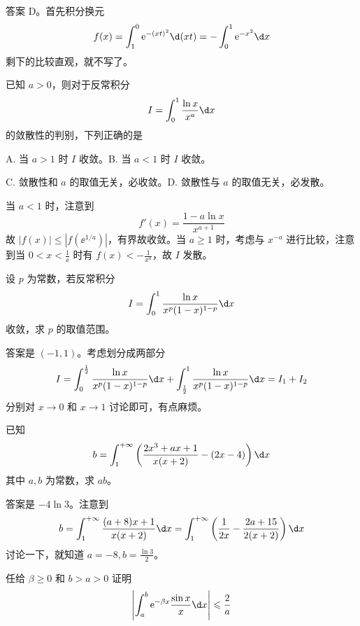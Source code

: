 \begin{solution}
	答案 D。首先积分换元
	\[ f(x) = \int_{1}^{0} \ee^{-(xt)^2} \d (xt) = -\int_{0}^{1} \ee^{-x^2} \d x  \]
	剩下的比较直观，就不写了。
\end{solution}


\begin{problem}[000027]
已知 $a > 0$，则对于反常积分
\[ I = \int_{0}^{1} \frac{\ln x}{x^a} \d x \]
的敛散性的判别，下列正确的是

A. 当 $a > 1$ 时 $I$ 收敛。B. 当 $a < 1$ 时 $I$ 收敛。

C. 敛散性和 $a$ 的取值无关，必收敛。D. 敛散性与 $a$ 的取值无关，必发散。
\end{problem}
\begin{solution}
	当 $a < 1$ 时，注意到
	\[ f'(x) = \frac{1 - a \ln x}{x^{a+1}} \]
	故 $|f(x)| \leqslant |f(\ee^{1/a})|$，有界故收敛。当 $a \geqslant 1$ 时，考虑与 $x^{-a}$ 进行比较，注意到当 $0 < x < \frac{1}{\ee}$ 时有 $f(x) < -\frac{1}{x^a}$，故 $I$ 发散。
\end{solution}

\begin{problem}[000028]
设 $p$ 为常数，若反常积分
\[ I = \int_{0}^{1} \frac{\ln x}{x^p(1-x)^{1-p}} \d x \]
收敛，求 $p$ 的取值范围。
\end{problem}
\begin{solution}
	答案是 $(-1,1)$。考虑划分成两部分
	\[ I = \int_{0}^{\frac{1}{2}} \frac{\ln x}{x^p(1-x)^{1-p}} \d x + \int_{\frac{1}{2}}^{1} \frac{\ln x}{x^p(1-x)^{1-p}} \d x = I_1 + I_2 \]
	分别对 $x \to 0$ 和 $x \to 1$ 讨论即可，有点麻烦。
\end{solution}

\begin{problem}[000029]
已知
\[ b = \int_{1}^{+\infty} \left(\frac{2x^3 + ax + 1}{x(x+2)} - (2x-4)\right) \d x \]
其中 $a,b$ 为常数，求 $ab$。
\end{problem}
\begin{solution}
	答案是 $-4 \ln 3$。注意到
	\[ b = \int_{1}^{+\infty} \frac{(a+8)x+1}{x(x+2)} \d x= \int_{1}^{+\infty} \left(\frac{1}{2x} - \frac{2a+15}{2(x+2)}\right) \d x \]
	讨论一下，就知道 $a = -8, b = \frac{\ln 3}{2} $。
\end{solution}

\begin{problem}[000044]
任给 $\beta \geqslant 0$ 和 $b > a > 0$ 证明
\[ \left| \int_{a}^{b} \ee^{-\beta x} \frac{\sin x}{x} \d x \right| \leqslant \frac{2}{a} \]
\end{problem}

